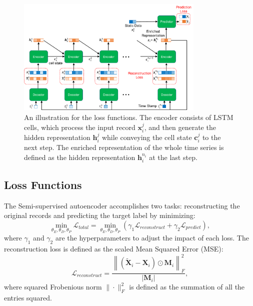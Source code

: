 \begin{figure}[t]
    \centering
    \includegraphics[width=0.8\textwidth]{figures/autoencoder.pdf}
    \caption{An illustration for the loss functions. The encoder consists of LSTM cells, which process the input record $\mathbf{x}_i^j$, and then generate the hidden representation $\mathbf{h}_i^j$ while conveying the cell state $\mathbf{c}_i^j$ to the next step. The enriched representation of the whole time series is defined as the hidden representation $\mathbf{h}_i^{n_i}$ at the last step.} \label{fig: autoencoder}
\end{figure}

\subsection{Loss Functions}
The Semi-supervised autoencoder accomplishes two tasks: reconstructing the original records and predicting the target label by minimizing:
\begin{equation}\label{eq: objective}
    \min_{\theta_E, \theta_D, \theta_P} \mathcal{L}_{total} = \min_{\theta_E, \theta_D, \theta_P}(\gamma_1\mathcal{L}_{reconstruct} + \gamma_2\mathcal{L}_{predict}),
\end{equation}
where $\gamma_1$ and $\gamma_2$ are the hyperparameters to adjust the impact of each loss.
The reconstruction loss is defined as the scaled Mean Squared Error (MSE):
\begin{equation}
    \mathcal{L}_{reconstruct} = \frac{\left\| (\tilde{\mathbf{X}}_i - \mathbf{X}_i) \odot \mathbf{M}_i \right\|_F^2}{|\mathbf{M}_i|},
\end{equation}
where squared Frobenious norm $\| \cdot \|_F^2$ is defined as the summation of all the entries squared.

